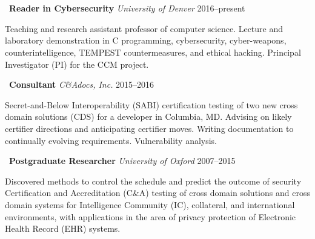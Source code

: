 \section*{}

\begin{comment}
\vspace{-10mm}
\emph{Technical programming, cybersecurity, certification and accreditation
of cross domain solutions and systems, cryptography, pentesting, security
research, writing and speaking. Specialist in understanding new government
computer security standards---especially when they're new or have
suddenly changed. Experienced in Common Criteria, DIACAP, NIST SP 800-53
and RMF, DCID 6/3, and DoD 8540.}
\end{comment}

\vspace{-10mm}
\noindent\textbullet\ \textbf{Reader in Cybersecurity}
    \hfill \emph{University of Denver} \hfill 2016--present

    \vspace{1mm}
    \noindent Teaching and research assistant professor of computer science.
    Lecture and laboratory demonstration in C programming, cybersecurity,
    cyber-weapons, counterintelligence, TEMPEST countermeasures, and ethical
    hacking. Principal Investigator (PI) for the CCM project.

\vspace{3mm}
\noindent\textbullet\ \textbf{Consultant}
    \hfill \emph{C\&Adocs, Inc.} \hfill 2015--2016

    \vspace{1mm}
    \noindent Secret-and-Below Interoperability (SABI) certification
    testing of two new cross domain solutions (CDS) for a developer in
    Columbia, MD. Advising on likely certifier directions and anticipating
    certifier moves. Writing documentation to continually evolving
    requirements. Vulnerability analysis.

\vspace{2mm}
\noindent\textbullet\ \textbf{Postgraduate Researcher}
    \hfill \emph{University of Oxford} \hfill 2007--2015

    \vspace{1mm}
    \noindent Discovered methods to control the schedule and predict the
    outcome of security Certification and Accreditation (C\&A)
    testing of cross domain solutions and cross domain systems for
    Intelligence Community (IC), collateral, and international
    environments, with applications in the area of privacy protection
    of Electronic Health Record (EHR) systems.


